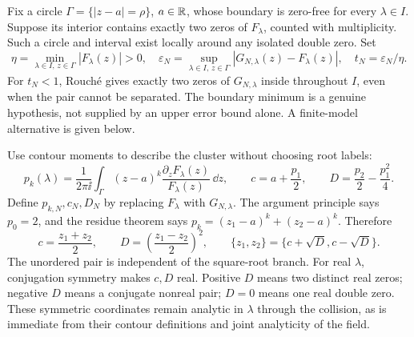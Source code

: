 Fix a circle \(\Gamma=\{|z-a|=\rho\}\), \(a\in\mathbb R\), whose boundary
is zero-free for every \(\lambda\in I\). Suppose its interior contains
exactly two zeros of \(F_\lambda\), counted with multiplicity.
Such a circle and interval exist locally around any isolated double
zero. Set
\begin{equation}
 \eta=\min_{\lambda\in I,\,z\in\Gamma}|F_\lambda(z)|>0,
 \quad \varepsilon_N=\sup_{\lambda\in I,\,z\in\Gamma}
          |G_{N,\lambda}(z)-F_\lambda(z)|,
 \quad t_N=\varepsilon_N/\eta.
 \label{eq:cluster-boundary-budget}
\end{equation}
For \(t_N<1\), Rouch\'e gives exactly two zeros of \(G_{N,\lambda}\)
inside throughout \(I\), even when the pair cannot be separated.
The boundary minimum is a genuine hypothesis, not supplied by an upper
error bound alone. A finite-model alternative is given below.

Use contour moments to describe the cluster without choosing root labels:
\begin{equation}
 p_k(\lambda)=\frac{1}{2\pi\ii}\int_\Gamma
       (z-a)^k\frac{\partial_zF_\lambda(z)}{F_\lambda(z)}\,\dd z,
 \qquad
 c=a+\frac{p_1}{2},\qquad D=\frac{p_2}{2}-\frac{p_1^2}{4}.
 \label{eq:cluster-coordinates}
\end{equation}
Define \(p_{k,N},c_N,D_N\) by replacing \(F_\lambda\) with
\(G_{N,\lambda}\). The argument principle says \(p_0=2\), and the
residue theorem says \(p_k=(z_1-a)^k+(z_2-a)^k\). Therefore
\begin{equation}
 c=\frac{z_1+z_2}{2},\qquad
 D=\left(\frac{z_1-z_2}{2}\right)^2,\qquad
 \{z_1,z_2\}=\{c+\sqrt D,c-\sqrt D\}.
 \label{eq:pair-discriminant}
\end{equation}
The unordered pair is independent of the square-root branch. For real
\(\lambda\), conjugation symmetry makes \(c,D\) real. Positive \(D\)
means two distinct real zeros; negative \(D\) means a conjugate nonreal
pair; \(D=0\) means one real double zero. These symmetric coordinates
remain analytic in \(\lambda\) through the collision, as is immediate
from their contour definitions and joint analyticity of the field.


